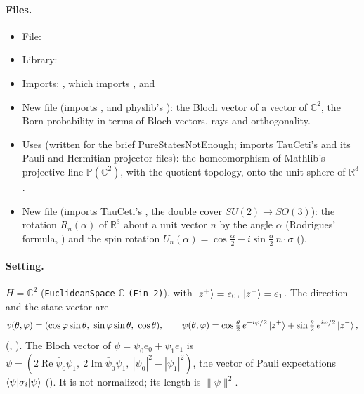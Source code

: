 \documentclass[11pt]{article}
\begin{document}
\paragraph{Files.}\leavevmode
\begin{itemize}
\item File: 
\item Library: 
\item Imports: , which imports
  , and
\item New file  (imports
  ,\newline
   and physlib's
  ): the Bloch vector of a vector of
  $\mathbb{C}^2$, the Born probability in terms of Bloch vectors, rays and orthogonality.
\item Uses  (written for the brief
  PureStatesNotEnough; imports TauCeti's  and its
  Pauli and Hermitian-projector files): the homeomorphism  of Mathlib's
  projective line $\mathbb{P}(\mathbb{C}^2)$, with the quotient topology, onto the unit sphere
  of $\mathbb{R}^3$.
\item New file  (imports TauCeti's
  , the double cover $SU(2) \to SO(3)$): the
  rotation $R_n(\alpha)$ of $\mathbb{R}^3$ about a unit vector $n$ by the angle $\alpha$
  (Rodrigues' formula, ) and the spin rotation
  $U_n(\alpha) = \cos\frac\alpha2 - i\sin\frac\alpha2\, n\cdot\sigma$ ().
\end{itemize}

\paragraph{Setting.} $H = \mathbb{C}^2$ (\texttt{EuclideanSpace} $\mathbb{C}$ \texttt{(Fin 2)}),
with $\ket{z^+} = e_0$, $\ket{z^-} = e_1$. The direction and the state vector are
\[
  v(\theta,\varphi) = (\cos\varphi\sin\theta,\ \sin\varphi\sin\theta,\ \cos\theta), \qquad
  \psi(\theta,\varphi) = \cos\tfrac\theta2\, e^{-i\varphi/2}\ket{z^+}
    + \sin\tfrac\theta2\, e^{i\varphi/2}\ket{z^-},
\]
(, ). The Bloch vector of $\psi = \psi_0 e_0 + \psi_1 e_1$ is
~$\psi = (2\operatorname{Re}\bar\psi_0\psi_1,\ 2\operatorname{Im}
\bar\psi_0\psi_1,\ |\psi_0|^2 - |\psi_1|^2)$, the vector of Pauli expectations
$\braket{\psi|\sigma_i|\psi}$ (). It is not normalized; its length is
$\|\psi\|^2$.
\end{document}
